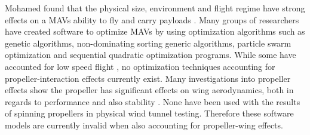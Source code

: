 Mohamed found that the physical size, environment and flight regime have strong effects on a \acrshort{MAV}s ability to fly and carry payloads \cite{Mohamed2014}. Many groups of researchers have created software to optimize \acrshort{MAV}s by using optimization algorithms such as genetic algorithms, non-dominating sorting generic algorithms, particle swarm optimization and sequential quadratic optimization programs. While some have accounted for low speed flight \cite{Vijayanandh2019, Bronz2009, HASSANALIAN2019}, no optimization techniques accounting for propeller-interaction effects currently exist. Many investigations into propeller effects show the propeller has significant effects on wing aerodynamics, both in regards to performance and also stability \cite{Parga2007, Jana2020}. None have been used with the results of spinning propellers in physical wind tunnel testing. Therefore these software models are currently invalid when also accounting for propeller-wing effects.


